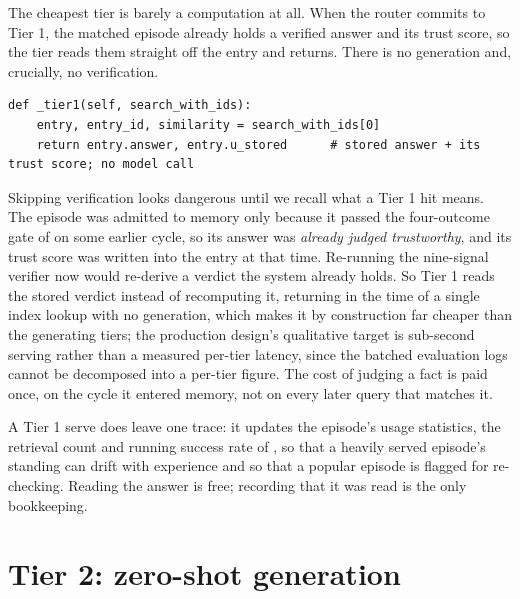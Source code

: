 The cheapest tier is barely a computation at all. When the router commits to Tier 1,
the matched episode already holds a verified answer and its trust score, so the tier
reads them straight off the entry and returns. There is no generation and, crucially,
no verification.

\begin{lstlisting}[caption={Tier 1, in full, from \texttt{caem/pipeline.py}.}, label={lst:tier1}]
def _tier1(self, search_with_ids):
    entry, entry_id, similarity = search_with_ids[0]
    return entry.answer, entry.u_stored      # stored answer + its trust score; no model call
\end{lstlisting}

\begin{precise}
Skipping verification looks dangerous until we recall what a Tier 1 hit means. The
episode was admitted to memory only because it passed the four-outcome gate of
 on some earlier cycle, so its answer was \emph{already judged
trustworthy}, and its trust score was written into the entry at that time. Re-running
the nine-signal verifier now would re-derive a verdict the system already holds. So
Tier 1 reads the stored verdict instead of recomputing it, returning in the time of a
single index lookup with no generation, which makes it by construction far cheaper than
the generating tiers; the production design's qualitative target is sub-second serving
rather than a measured per-tier latency, since the batched evaluation logs cannot be
decomposed into a per-tier figure. The cost of judging a fact is paid once, on
the cycle it entered memory, not on every later query that matches it.
\end{precise}

A Tier 1 serve does leave one trace: it updates the episode's usage statistics, the
retrieval count and running success rate of , so that a
heavily served episode's standing can drift with experience and so that a popular
episode is flagged for re-checking. Reading the answer is free; recording that it was
read is the only bookkeeping.

\section{Tier 2: zero-shot generation}
\label{sec:tiers-tier2}

